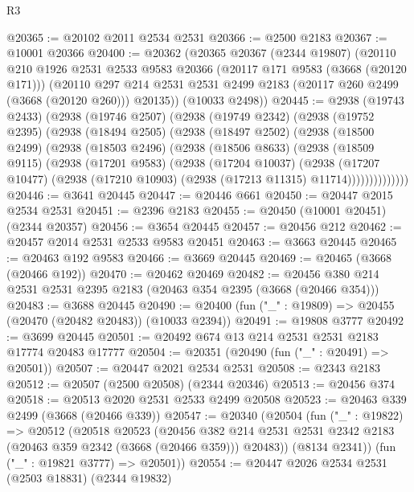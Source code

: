 \begin{lexlean}{R3}
\begin{coremodule}
@20365 := @20102 @2011 @2534 @2531
@20366 := @2500 @2183
@20367 := @10001 @20366
@20400 := @20362
    (@20365
      @20367
      (@2344 @19807)
      (@20110
        @210
        @1926
        @2531
        @2533
        @9583
        @20366
        (@20117 @171 @9583 (@3668 (@20120 @171)))
        (@20110 @297 @214 @2531 @2531 @2499 @2183 (@20117 @260 @2499 (@3668 (@20120 @260))) @20135))
      (@10033 @2498))
@20445 := @2938
    (@19743 @2433)
    (@2938
      (@19746 @2507)
      (@2938
        (@19749 @2342)
        (@2938
          (@19752 @2395)
          (@2938
            (@18494 @2505)
            (@2938
              (@18497 @2502)
              (@2938
                (@18500 @2499)
                (@2938
                  (@18503 @2496)
                  (@2938
                    (@18506 @8633)
                    (@2938
                      (@18509 @9115)
                      (@2938
                        (@17201 @9583)
                        (@2938
                          (@17204 @10037)
                          (@2938
                            (@17207 @10477)
                            (@2938 (@17210 @10903) (@2938 (@17213 @11315) @11714))))))))))))))
@20446 := @3641 @20445
@20447 := @20446 @661
@20450 := @20447 @2015 @2534 @2531
@20451 := @2396 @2183
@20455 := @20450 (@10001 @20451) (@2344 @20357)
@20456 := @3654 @20445
@20457 := @20456 @212
@20462 := @20457 @2014 @2531 @2533 @9583 @20451
@20463 := @3663 @20445
@20465 := @20463 @192 @9583
@20466 := @3669 @20445
@20469 := @20465 (@3668 (@20466 @192))
@20470 := @20462 @20469
@20482 := @20456 @380 @214 @2531 @2531 @2395 @2183 (@20463 @354 @2395 (@3668 (@20466 @354)))
@20483 := @3688 @20445
@20490 := @20400 (fun ("_" : @19809) => @20455 (@20470 (@20482 @20483)) (@10033 @2394))
@20491 := @19808 @3777
@20492 := @3699 @20445
@20501 := @20492 @674 @13 @214 @2531 @2531 @2183 @17774 @20483 @17777
@20504 := @20351 (@20490 (fun ("_" : @20491) => @20501))
@20507 := @20447 @2021 @2534 @2531
@20508 := @2343 @2183
@20512 := @20507 (@2500 @20508) (@2344 @20346)
@20513 := @20456 @374
@20518 := @20513 @2020 @2531 @2533 @2499 @20508
@20523 := @20463 @339 @2499 (@3668 (@20466 @339))
@20547 := @20340
    (@20504
      (fun ("_" : @19822) =>
      @20512
        (@20518
          @20523
          (@20456
            @382
            @214
            @2531
            @2531
            @2342
            @2183
            (@20463 @359 @2342 (@3668 (@20466 @359)))
            @20483))
        (@8134 @2341))
      (fun ("_" : @19821 @3777) => @20501))
@20554 := @20447 @2026 @2534 @2531 (@2503 @18831) (@2344 @19832)

\end{coremodule}
\end{lexlean}
